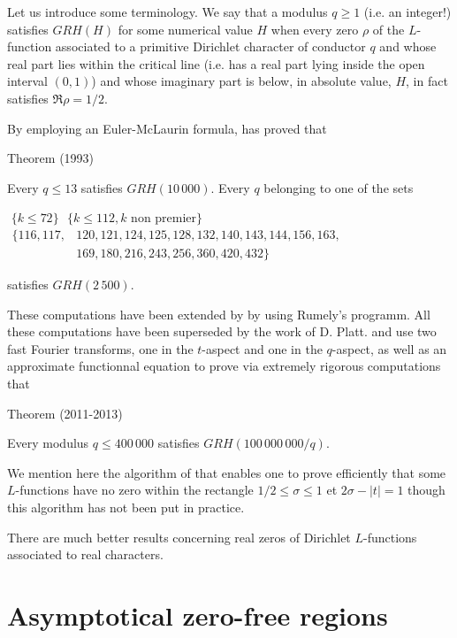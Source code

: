 Let us introduce some terminology. We say that a modulus $q\ge1$ (i.e. an
integer!) satisfies $GRH(H)$ for some numerical value $H$ when
every zero $\rho$ of the $L$-function associated to a primitive Dirichlet
character of conductor $q$ and whose real part lies within the critical line (i.e. has a
real part lying inside the open interval $(0,1)$) and whose imaginary part is
below, in absolute value, $H$, in fact satisfies $\Re\rho=1/2$.

By employing an Euler-McLaurin formula,
\cite{Rumely*93}
has proved that

\begin{thm}{Theorem (1993)}

  
  Every $q\le 13$ satisfies $GRH(10\,000)$.
  Every $q$ belonging to one of the sets
  
    \,\,$\{k\le 72\}$
    \,\,$\{k\le 112, \text{$k$ non premier}\}$
    \,$\begin{aligned}\{116, 117, &120, 121, 124, 125, 128, 132, 140,
     143, 144, 156, 163, \\ &169, 180, 216, 243, 256, 360, 420, 432\}\end{aligned}$
    
    satisfies $GRH(2\,500)$.
    
    
\end{thm}

These computations have been extended by 
\cite{Bennett*01}
by using Rumely's programm. All these computations have been
superseded by the work of D. Platt.
\cite{Platt*11} and
\cite{Platt*13}
use two fast Fourier transforms, one in the $t$-aspect and one in the
$q$-aspect, as well as an approximate functionnal equation to prove via
extremely rigorous computations that
\begin{thm}{Theorem (2011-2013)}

  Every modulus $q\le 400\,000$ satisfies
    $GRH(100\,000\,000/q)$.
\end{thm}


We mention here the algorithm of
\cite{Omar*01}
that enables one to prove efficiently that some $L$-functions have no zero
    within the rectangle
$1/2\le \sigma\le1$ et $2\sigma-|t|=1$ though this algorithm has not been put
    in practice.

There are much better results concerning real zeros of Dirichlet $L$-functions
    associated to real characters.


\section{Asymptotical zero-free regions
}



